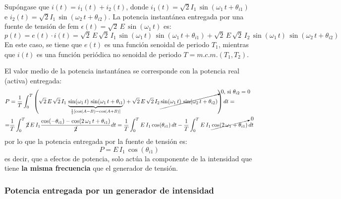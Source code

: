 Supóngase que $i(t) = i_1(t) + i_2(t)$, donde
$i_1(t)=\sqrt{2}I_{1}\,\sin(\omega_1\,t+\theta_{i1})$ e
$i_2(t)=\sqrt{2}I_{1}\,\sin(\omega_2\,t+\theta_{i2})$. La potencia
instantánea entregada por una fuente de tensión de fem
$\epsilon(t)=\sqrt{2}\,E\,\sin(\omega_1\,t)$ es:
\begin{equation*}
  p(t) = e(t)\cdot i(t) = \sqrt{2}\,E\, \sqrt{2}\,I_{1}\,\sin(\omega_1\,t)\,\sin(\omega_1\,t+\theta_{i1}) +\sqrt{2}\,E\, \sqrt{2}\,I_{2}\,\sin(\omega_1\,t)\,\sin(\omega_2\,t+\theta_{i2})
\end{equation*} 
En este caso, se tiene que $e(t)$ es una función senoidal de periodo
$T_1$, mientras que $i(t)$ es una función periódica no senoidal de
periodo $T=m.c.m.(T_1,T_2)$.

El valor medio de la potencia instantánea se corresponde con la
potencia real (activa) entregada:
\begin{align*}
  P&=\dfrac{1}{T}\int_0^{T}\left( \sqrt{2}\,E\,\sqrt{2}\, I_{1}\,\underbrace{\sin(\omega_1\,t)\,\sin(\omega_1\,t+\theta_{i1}}_{\frac{1}{2}\left[\cos(A-B)-\cos(A+B)\right]}) + \sqrt{2}\,E\,\sqrt{2}\, I_{2}\,\cancelto{\text{0, si $\theta_{i2}=0$}}{\sin(\omega_1\,t)\,\sin(\omega_2\,t+\theta_{i2})}\right)dt=\\
  =&\dfrac{1}{T}\int_0^T \cancel{2}\,E\,I_{1}\dfrac{\cos(-\theta_{i1})-\cos(2\,\omega_1\,t+\theta_{i1})}{\cancel{2}}dt =\dfrac{1}{T}\int_0^T E\,I_{1}\,{\cos(\theta_{i1})}\,dt-\dfrac{1}{T}\int_0^T E\,I_{1}\,\cancelto{0}{{\cos(2\,\omega_1+\theta_{i1})}}\,dt
\end{align*}
por lo que la potencia entregada por la fuente de tensión es:
\begin{equation}\label{eq.P_E_superposicion}
  \boxed{P=E\,I_1\,\cos(\theta_{i1})}
\end{equation}
es decir, que a efectos de potencia, solo actúa la componente de la
intensidad que tiene \textbf{la misma frecuencia} que el generador de
tensión.

\subsubsection{Potencia entregada por un generador de intensidad}

